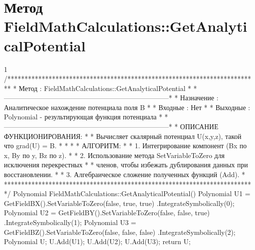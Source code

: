 \section{Метод FieldMathCalculations::GetAnalyticalPotential}
\footnotesize
\begin{listing}{1}
/*************************************************************************
* Метод         : FieldMathCalculations::GetAnalyticalPotential          *
*------------------------------------------------------------------------*
* Назначение    : Аналитическое нахождение потенциала поля B             *
* Входные       : Нет                                                    *
* Выходные      : Polynomial - результирующая функция потенциала         *
*------------------------------------------------------------------------*
* ОПИСАНИЕ ФУНКЦИОНИРОВАНИЯ:                                             *
* Вычисляет скалярный потенциал U(x,y,z), такой что grad(U) = B.         *
* *
* АЛГОРИТМ:                                                              *
* 1. Интегрирование компонент (Bx по x, By по y, Bz по z).               *
* 2. Использование метода SetVariableToZero для исключения перекрестных  *
* членов, чтобы избежать дублирования данных при восстановлении.        *
* 3. Алгебраическое сложение полученных функций (Add).                   *
*************************************************************************/
Polynomial FieldMathCalculations::GetAnalyticalPotential() {
    Polynomial U1 = GetFieldBX().SetVariableToZero(false, true, true)
                                .IntegrateSymbolically(0);
    Polynomial U2 = GetFieldBY().SetVariableToZero(false, false, true)
                                .IntegrateSymbolically(1);
    Polynomial U3 = GetFieldBZ().SetVariableToZero(false, false, false)
                                .IntegrateSymbolically(2);
    Polynomial U; U.Add(U1); U.Add(U2); U.Add(U3);
    return U;
}
\end{listing}
\normalsize

\pagebreak


